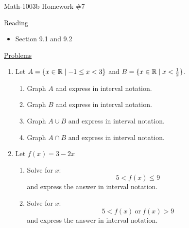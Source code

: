 \documentclass[letterpaper,12pt,fleqn]{article}
\begin{document}
\begin{center}
\Large Math-1003b Homework \#7
\end{center}

\vspace{0.5in}

\underline{Reading}

\bigskip

\begin{itemize}
\item Section 9.1 and 9.2
\end{itemize}

\bigskip

\underline{Problems}

\bigskip

\begin{enumerate}
\item Let $A=\{x\in\mathbb{R}\mid -1\le x<3\}$ and $B=\{x\in\mathbb{R}\mid x<\frac{1}{2}\}$.
  \begin{enumerate}
    \item Graph $A$ and express in interval notation.
    \item Graph $B$ and express in interval notation.
    \item Graph $A\cup B$ and express in interval notation.
    \item Graph $A\cap B$ and express in interval notation.
  \end{enumerate}

\item Let $f(x)=3-2x$
  \begin{enumerate}
  \item Solve for $x$:
    \[5<f(x)\le 9\]
    and express the answer in interval notation.
  \item Solve for $x$:
    \[5<f(x)\ \mbox{or}\ f(x)>9\]
    and express the answer in interval notation.
  \end{enumerate}
  
\end{enumerate}
\end{document}
